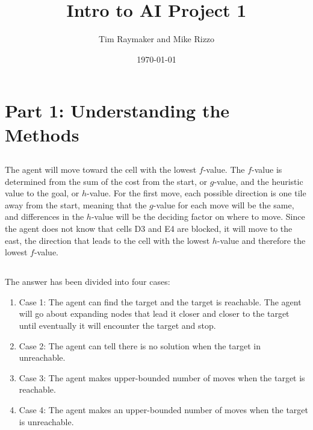 \documentclass[a4paper,12pt]{article}
\begin{document}
\title{Intro to AI Project 1}
\author{Tim Raymaker and Mike Rizzo}
\date{\today}

\maketitle

\section{Part 1: Understanding the Methods}

\subsection{}
The agent will move toward the cell with the lowest $f$-value. The $f$-value is determined from the sum of the cost from the start, or $g$-value,  and the heuristic value to the goal, or $h$-value. For the first move, each possible direction is one tile away from the start, meaning that the $g$-value for each move will be the same, and differences in the $h$-value will be the deciding factor on where to move. Since the agent does not know that cells D3 and E4 are blocked, it will move to the east, the direction that leads to the cell with the lowest $h$-value and therefore the lowest $f$-value. 

\subsection{}
The answer has been divided into four cases:
\begin{enumerate}
	\item Case 1: The agent can find the target and the target is reachable.
		\newline The agent will go about expanding nodes that lead it closer and closer to the target until eventually it will encounter the target and stop. 
		
	\item Case 2: The agent can tell there is no solution when the target in unreachable.
		\newline
		
	\item Case 3: The agent makes upper-bounded number of moves when the target is reachable.
		\newline
		
	\item Case 4: The agent makes an upper-bounded number of moves when the target is unreachable.
		\newline
		
\end{enumerate}
\end{document}
